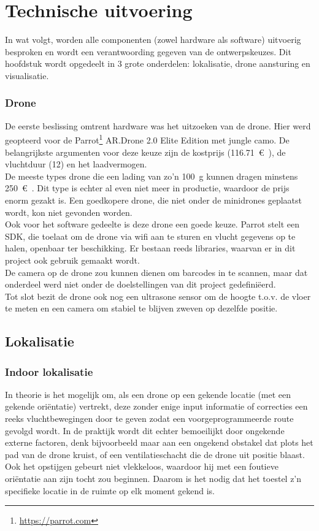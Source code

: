 \chapter{Technische uitvoering}
In wat volgt, worden alle componenten (zowel hardware als software) uitvoerig besproken en wordt een verantwoording gegeven van de ontwerpskeuzes.
Dit hoofdstuk wordt opgedeelt in 3 grote onderdelen: lokalisatie, drone aansturing en visualisatie.

\subsection{Drone} \label{sec:drone}
De eerste beslissing omtrent hardware was het uitzoeken van de drone.
Hier werd geopteerd voor de Parrot\footnote{\url{https://parrot.com}} AR.Drone 2.0 Elite Edition met jungle camo.
De belangrijkste argumenten voor deze keuze zijn de kostprijs (\SI{116.71}{\euro{}}), de vluchtduur (\SI{12}{\min}) en het laadvermogen.\\

De meeste types drone die een lading van zo'n \SI{100}{\g} kunnen dragen minstens \SI{250}{\euro{}}.
Dit type is echter al even niet meer in productie, waardoor de prijs enorm gezakt is.
Een goedkopere drone, die niet onder de minidrones geplaatst wordt, kon niet gevonden worden.\\

Ook voor het software gedeelte is deze drone een goede keuze. Parrot stelt een SDK, die toelaat om de drone via wifi aan te sturen en vlucht gegevens op te halen, openbaar ter beschikking.
Er bestaan reeds libraries, waarvan er in dit project ook gebruik gemaakt wordt.\\
De camera op de drone zou kunnen dienen om barcodes in te scannen, maar dat onderdeel werd niet onder de doelstellingen van dit project gedefini\"eerd.\\
Tot slot bezit de drone ook nog een ultrasone sensor om de hoogte t.o.v. de vloer te meten en een camera om stabiel te blijven zweven op dezelfde positie.

\section{Lokalisatie}
\subsection{Indoor lokalisatie}  \label{sec:uwb}
In theorie is het mogelijk om, als een drone op een gekende locatie (met een gekende ori\"entatie) vertrekt, deze zonder enige input informatie of correcties een reeks vluchtbewegingen door te geven zodat een voorgeprogrammeerde route gevolgd wordt. In de praktijk wordt dit echter bemoeilijkt door ongekende externe factoren, denk bijvoorbeeld maar aan een ongekend obstakel dat plots het pad van de drone kruist, of een ventilatieschacht die de drone uit positie blaast. Ook het opstijgen gebeurt niet vlekkeloos, waardoor hij met een foutieve ori\"entatie aan zijn tocht zou beginnen. Daarom is het nodig dat het toestel z'n specifieke locatie in de ruimte op elk moment gekend is.\\

